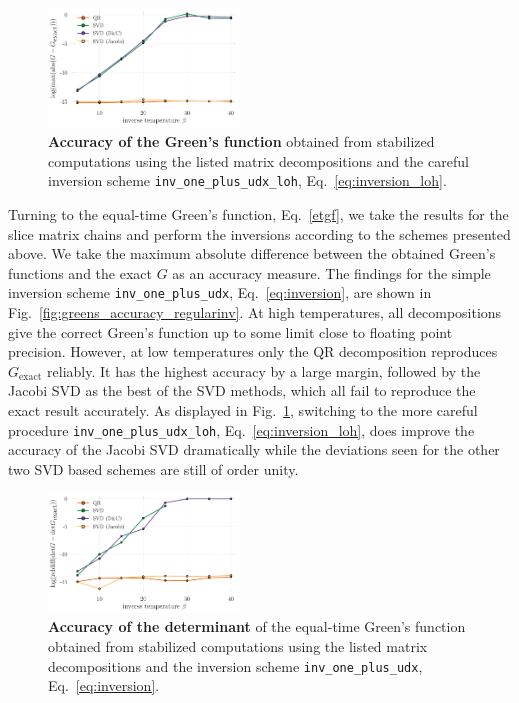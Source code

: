 \documentclass[%
 reprint,
superscriptaddress,
citeautoscript,
showpacs,
 amsmath,amssymb,
 aps,
 prb,
longbibliography,
]{revtex4-1}
\begin{document}
\begin{figure}[t]
	\includegraphics[width=0.45\textwidth]{../notebooks/accuracy_greens_svd_loh.pdf}
	\caption{\textbf{Accuracy of the Green's function} obtained from stabilized computations using the listed matrix decompositions and the careful inversion scheme \texttt{inv\_one\_plus\_udx\_loh}, Eq.~\ref{eq:inversion_loh}. \label{fig:greens_accuracy_loh}}
\end{figure}

Turning to the equal-time Green's function, Eq.~\eqref{etgf}, we take the results for the slice matrix chains and perform the inversions according to the schemes presented above. We take the maximum absolute difference between the obtained Green's functions and the exact $G$ as an accuracy measure. The findings for the simple inversion scheme \texttt{inv\_one\_plus\_udx}, Eq.~\ref{eq:inversion}, are shown in Fig.~\ref{fig:greens_accuracy_regularinv}. At high temperatures, all decompositions give the correct Green's function up to some limit close to floating point precision. However, at low temperatures only the QR decomposition reproduces $G_{\textrm{exact}}$ reliably. It has the highest accuracy by a large margin, followed by the Jacobi SVD as the best of the SVD methods, which all fail to reproduce the exact result accurately. As displayed in Fig.~\ref{fig:greens_accuracy_loh}, switching to the more careful procedure \texttt{inv\_one\_plus\_udx\_loh}, Eq.~\ref{eq:inversion_loh}, does improve the accuracy of the Jacobi SVD dramatically while the deviations seen for the other two SVD based schemes are still of order unity.
\begin{figure}
	\includegraphics[width=0.45\textwidth]{../notebooks/accuracy_det_svd_regularinv.pdf}
	\caption{\textbf{Accuracy of the determinant} of the equal-time Green's function obtained from stabilized computations using the listed matrix decompositions and the inversion scheme \texttt{inv\_one\_plus\_udx}, Eq.~\ref{eq:inversion}. \label{fig:det_accuracy_regularinv}}
\end{figure}
\end{document}

